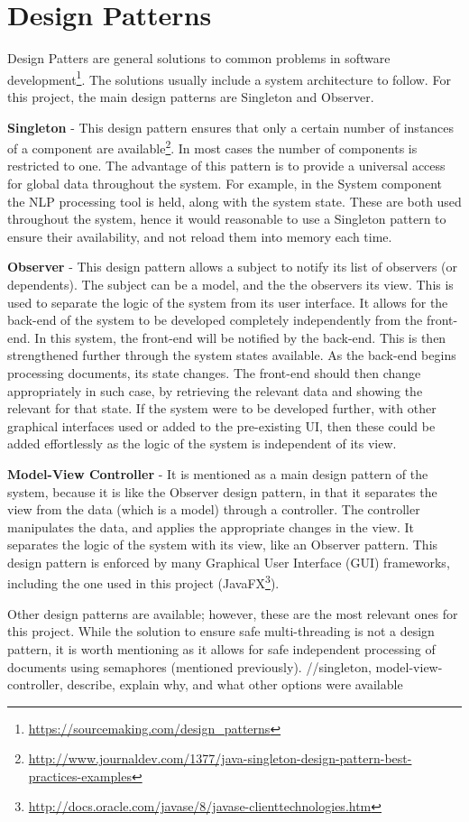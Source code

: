 \section{Design Patterns}
\par Design Patters are general solutions to common problems in software development\footnote{\url{https://sourcemaking.com/design_patterns}}. The solutions usually include a system architecture to follow. For this project, the main design patterns are Singleton and Observer.
\par \textbf{Singleton} - This design pattern ensures that only a certain number of instances of a component are available\footnote{\url{http://www.journaldev.com/1377/java-singleton-design-pattern-best-practices-examples}}. In most cases the number of components is restricted to one. The advantage of this pattern is to provide a universal access for global data throughout the system. For example, in the System component the NLP processing tool is held, along with the system state. These are both used throughout the system, hence it would reasonable to use a Singleton pattern to ensure their availability, and not reload them into memory each time.
\par \textbf{Observer} - This design pattern allows a subject to notify its list of observers (or dependents). The subject can be a model, and the the observers its view. This is used to separate the logic of the system from its user interface. It allows for the back-end of the system to be developed completely independently from the front-end. In this system, the front-end will be notified by the back-end. This is then strengthened further through the system states available. As the back-end begins processing documents, its state changes. The front-end should then change appropriately in such case, by retrieving the relevant data and showing the relevant for that state. If the system were to be developed further, with other graphical interfaces used or added to the pre-existing UI, then these could be added effortlessly as the logic of the system is independent of its view.
\par \textbf{Model-View Controller} - It is mentioned as a main design pattern of the system, because it is like the Observer design pattern, in that it separates the view from the data (which is a model) through a controller. The controller manipulates the data, and applies the appropriate changes in the view. It separates the logic of the system with its view, like an Observer pattern. This design pattern is enforced by many Graphical User Interface (GUI) frameworks, including the one used in this project (JavaFX\footnote{\url{http://docs.oracle.com/javase/8/javase-clienttechnologies.htm}}). 
\par Other design patterns are available; however, these are the most relevant ones for this project. While the solution to ensure safe multi-threading is not a design pattern, it is worth mentioning as it allows for safe independent processing of documents using semaphores (mentioned previously). 
//singleton, model-view-controller, describe, explain why, and what other options were available

